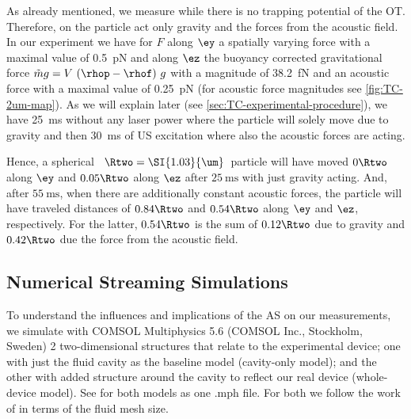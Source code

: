 As already mentioned, we measure while there is no trapping potential of the 
OT. Therefore, on the particle act only gravity and the forces from the 
acoustic field. In our experiment we have for $F$ along $\ey$ a spatially 
varying force with a maximal value of \SI{0.5}{\pico\newton} and along $\ez$ 
the buoyancy corrected gravitational force $\tilde{m}g=V\,\left( \rhop-\rhof 
\right)\,g$ with a magnitude of \SI{38.2}{\femto\newton} and an acoustic force 
with a maximal value of \SI{0.25}{\pico\newton} (for acoustic force magnitudes 
see \cref{fig:TC-2um-map}). As we will explain later (see 
\cref{sec:TC-experimental-procedure}), we have \SI{25}{\ms} without any laser 
power where the particle will solely move due to gravity and then \SI{30}{\ms} 
of US excitation where also the acoustic forces are acting.

Hence, a spherical \SiO~$\Rtwo=\SI{1.03}{\um}$~particle will have moved 
$0\Rtwo$ along $\ey$ and $0.05\Rtwo$ along $\ez$ after $\SI{25}{\ms}$ with just 
gravity acting. And, after $\SI{55}{\ms}$, when there are additionally 
constant acoustic forces, the particle will have traveled distances of 
$0.84\Rtwo$ and $0.54\Rtwo$ along $\ey$ and $\ez$, respectively. For the 
latter, $0.54\Rtwo$ is the sum of $0.12\Rtwo$ due to gravity and $0.42\Rtwo$ 
due the force from the acoustic field.

\subsection{Numerical Streaming Simulations}

To understand the influences and implications of the AS on our measurements, we 
simulate with {\ttfamily COMSOL Multiphysics 5.6} (COMSOL Inc., Stockholm, 
Sweden) 2 two-dimensional structures that relate to the experimental device; 
one with just the fluid cavity as the baseline model (cavity-only model); and 
the other with added structure around the cavity to reflect our real device 
(whole-device model). See \cite{supplemental} for both models as one {\ttfamily 
.mph} file. For both we follow the work of \citeauthor{Muller2015} 
\cite{Muller2015} in terms of the fluid mesh size.

